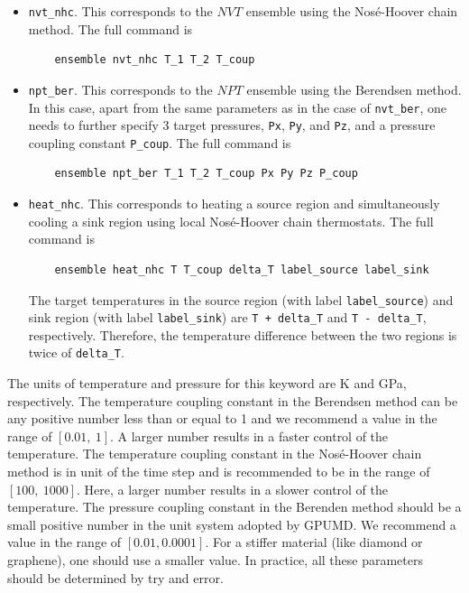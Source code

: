 \documentclass[12pt,a4paper]{report}
\begin{document}
\begin{enumerate}
\begin{itemize}
\item \verb"nvt_nhc". This corresponds to the $NVT$ ensemble using the Nos\'{e}-Hoover chain method. The full command is
\begin{verbatim}
    ensemble nvt_nhc T_1 T_2 T_coup
\end{verbatim}

\item \verb"npt_ber". This corresponds to the $NPT$ ensemble using the Berendsen method. In this case, apart from the same parameters as in the case of \verb"nvt_ber", one needs to further specify 3 target pressures, \verb"Px", \verb"Py", and \verb"Pz", and a pressure coupling constant \verb"P_coup". The full command is
\begin{verbatim}
    ensemble npt_ber T_1 T_2 T_coup Px Py Pz P_coup
\end{verbatim}

\item \verb"heat_nhc". This corresponds to heating a source region and simultaneously cooling a sink region using local Nos\'{e}-Hoover chain thermostats. The full command is
\begin{verbatim}
    ensemble heat_nhc T T_coup delta_T label_source label_sink
\end{verbatim}
The target temperatures in the source region (with label \verb"label_source") and sink region (with label \verb"label_sink") are \verb"T + delta_T" and \verb"T - delta_T", respectively. Therefore, the temperature difference between the two regions is twice of \verb"delta_T".

\end{itemize}


The units of temperature and pressure for this keyword are K and GPa, respectively. The temperature coupling constant in the Berendsen method can be any positive number less than or equal to 1 and we recommend a value in the range of $[0.01,~1]$. A larger number results in a faster control of the temperature. The temperature coupling constant in the Nos\'{e}-Hoover chain method is in unit of the time step and is recommended to be in the range of $[100,~1000]$. Here, a larger number results in a slower control of the temperature. The pressure coupling constant in the Berenden method should be a small positive number in the unit system adopted by GPUMD. We recommend a value in the range of $[0.01,0.0001]$. For a stiffer material (like diamond or graphene), one should use a smaller value. In practice, all these parameters should be determined by try and error.



\end{enumerate}
\end{document}
